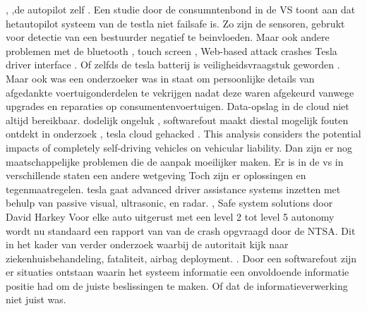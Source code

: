\cite{evan01042019teslaautopilotIntersection},
\cite{lambert31062020q2safetyreport},de autopilot zelf
\cite{templeton06092019HTSBReportTesla}. Een studie door de consumntenbond in de VS toont aan dat hetautopilot systeem van de testla niet failsafe is. Zo zijn de sensoren, gebrukt voor detectie van een bestuurder negatief te beinvloeden.
\cite{dowling23042021autopilottricking} Maar ook andere problemen met de bluetooth 
\cite{wiredBloutoothHackTesla}, touch screen
\cite{preston14012021NHTSATeslaRecall},
Web-based attack crashes Tesla driver interface
\cite{leyden23032020TeslaInterfaceHack}.
Of zelfds de tesla batterij is veiligheidsvraagstuk geworden
\cite{mitchell01072020teslabatterycooling}.
Maar ook was een onderzoeker  was in staat om persoonlijke details van afgedankte voertuigonderdelen  te vekrijgen nadat deze waren afgekeurd vanwege upgrades en reparaties op consumentenvoertuigen.
\cite{stumpff04052020TeslaPersonalData}
Data-opslag in de cloud niet altijd bereikbaar.
\cite{mitchell24022020AIDataTesla}
dodelijk ongeluk
\cite{fottrell03092018TeslaSecurityChecks},
softwarefout maakt diestal mogelijk
\cite{kirk26112020modelX}
fouten ontdekt in onderzoek
\cite{bbc24022021hyundaiBatteryFireFix},
tesla cloud gehacked
\cite{hawkins22102022}.
This analysis considers the potential impacts of completely self-driving vehicles on vehicular liability. 
\cite{griemannExaminSelfDriving}
Dan zijn er nog maatschappelijke problemen die de aanpak moeilijker maken.
Er is in de vs in verschillende staten een andere wetgeving
\cite{berry21042021teslacrashtexas}
\cite{hull23072021regulatorsaftercrash}
\cite{wikiTeslaAutopilot}
Toch zijn er oplossingen en tegenmaatregelen.
tesla gaat advanced driver assistance systems inzetten met behulp van  passive visual, ultrasonic, en radar.
\cite{tasking07062017TeslaAugmentedSafety},\cite{ackerman01072016TeslaImperfect}
Safe system solutions door David Harkey
\cite{Harkey30052019SafeSystemVehicle}
Voor elke auto uitgerust met een level 2 tot level 5 autonomy wordt nu standaard een rapport van van de crash opgvraagd door de NTSA. Dit in het kader van verder onderzoek waarbij de autoritait kijk naar  ziekenhuisbehandeling, fataliteit, airbag deployment.
\cite{szymkowski29062021nhtsaTeslaCrashReports}. 
Door een softwarefout zijn er situaties ontstaan waarin het systeem informatie een onvoldoende informatie positie had om de juiste beslissingen te maken. Of dat de informatieverwerking niet juist was.
